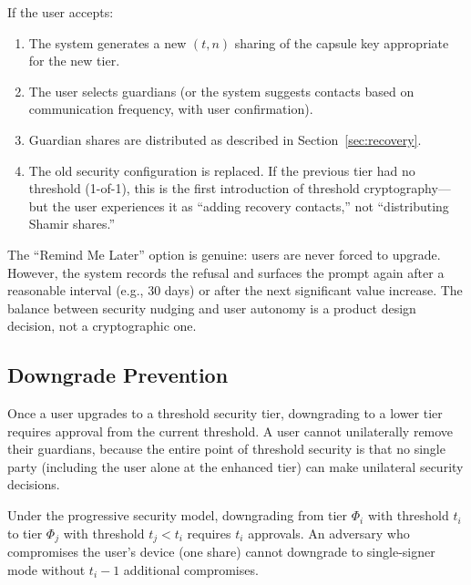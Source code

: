 If the user accepts:

\begin{enumerate}
    \item The system generates a new $(t, n)$ sharing of the capsule key
    appropriate for the new tier.
    \item The user selects guardians (or the system suggests contacts based
    on communication frequency, with user confirmation).
    \item Guardian shares are distributed as described in Section~\ref{sec:recovery}.
    \item The old security configuration is replaced. If the previous tier
    had no threshold (1-of-1), this is the first introduction of threshold
    cryptography---but the user experiences it as ``adding recovery contacts,''
    not ``distributing Shamir shares.''
\end{enumerate}

\begin{remark}
The ``Remind Me Later'' option is genuine: users are never forced to upgrade.
However, the system records the refusal and surfaces the prompt again after
a reasonable interval (e.g., 30 days) or after the next significant value
increase. The balance between security nudging and user autonomy is a
product design decision, not a cryptographic one.
\end{remark}

\subsection{Downgrade Prevention}

Once a user upgrades to a threshold security tier, downgrading to a lower
tier requires approval from the current threshold. A user cannot unilaterally
remove their guardians, because the entire point of threshold security is
that no single party (including the user alone at the enhanced tier) can
make unilateral security decisions.

\begin{proposition}
Under the progressive security model, downgrading from tier $\Phi_i$ with
threshold $t_i$ to tier $\Phi_j$ with threshold $t_j < t_i$ requires
$t_i$ approvals. An adversary who compromises the user's device (one share)
cannot downgrade to single-signer mode without $t_i - 1$ additional
compromises.
\end{proposition}

